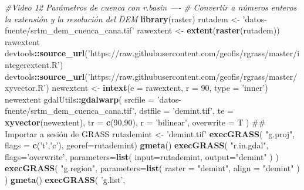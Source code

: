 \documentclass[11pt,]{article}
\newenvironment{Shaded}{\begin{snugshade}}{\end{snugshade}}
\newcommand{\KeywordTok}[1]{\textcolor[rgb]{0.13,0.29,0.53}{\textbf{#1}}}
\newcommand{\DataTypeTok}[1]{\textcolor[rgb]{0.13,0.29,0.53}{#1}}
\newcommand{\DecValTok}[1]{\textcolor[rgb]{0.00,0.00,0.81}{#1}}
\newcommand{\StringTok}[1]{\textcolor[rgb]{0.31,0.60,0.02}{#1}}
\newcommand{\CommentTok}[1]{\textcolor[rgb]{0.56,0.35,0.01}{\textit{#1}}}
\newcommand{\OperatorTok}[1]{\textcolor[rgb]{0.81,0.36,0.00}{\textbf{#1}}}
\newcommand{\NormalTok}[1]{#1}
\begin{document}
\begin{Shaded}
\begin{Highlighting}[]
\CommentTok{#Video 12 Parámetros de cuenca con r.basin ----}
\CommentTok{# Convertir a números enteros la extensión y la resolución del DEM}
\KeywordTok{library}\NormalTok{(raster)}
\NormalTok{rutadem <-}\StringTok{ 'datos-fuente/srtm_dem_cuenca_cana.tif'}
\NormalTok{rawextent <-}\StringTok{ }\KeywordTok{extent}\NormalTok{(}\KeywordTok{raster}\NormalTok{(rutadem))}
\NormalTok{rawextent}
\NormalTok{devtools}\OperatorTok{::}\KeywordTok{source_url}\NormalTok{(}\StringTok{'https://raw.githubusercontent.com/geofis/rgrass/master/integerextent.R'}\NormalTok{)}
\NormalTok{devtools}\OperatorTok{::}\KeywordTok{source_url}\NormalTok{(}\StringTok{'https://raw.githubusercontent.com/geofis/rgrass/master/xyvector.R'}\NormalTok{)}
\NormalTok{newextent <-}\StringTok{ }\KeywordTok{intext}\NormalTok{(}\DataTypeTok{e =}\NormalTok{ rawextent, }\DataTypeTok{r =} \DecValTok{90}\NormalTok{, }\DataTypeTok{type =} \StringTok{'inner'}\NormalTok{)}
\NormalTok{newextent}
\NormalTok{gdalUtils}\OperatorTok{::}\KeywordTok{gdalwarp}\NormalTok{(}
    \DataTypeTok{srcfile =} \StringTok{'datos-fuente/srtm_dem_cuenca_cana.tif'}\NormalTok{,}
  \DataTypeTok{dstfile =} \StringTok{'demint.tif'}\NormalTok{,}
  \DataTypeTok{te =} \KeywordTok{xyvector}\NormalTok{(newextent),}
  \DataTypeTok{tr =} \KeywordTok{c}\NormalTok{(}\DecValTok{90}\NormalTok{,}\DecValTok{90}\NormalTok{),}
  \DataTypeTok{r =} \StringTok{'bilinear'}\NormalTok{,}
  \DataTypeTok{overwrite =}\NormalTok{ T}
\NormalTok{)}
\NormalTok{## Importar a sesión de GRASS}
\NormalTok{rutademint <-}\StringTok{ 'demint.tif'}
\KeywordTok{execGRASS}\NormalTok{(}
  \StringTok{"g.proj"}\NormalTok{,}
  \DataTypeTok{flags =} \KeywordTok{c}\NormalTok{(}\StringTok{'t'}\NormalTok{,}\StringTok{'c'}\NormalTok{),}
  \DataTypeTok{georef=}\NormalTok{rutademint)}
\KeywordTok{gmeta}\NormalTok{()}
\KeywordTok{execGRASS}\NormalTok{(}
  \StringTok{"r.in.gdal"}\NormalTok{,}
  \DataTypeTok{flags=}\StringTok{'overwrite'}\NormalTok{,}
  \DataTypeTok{parameters=}\KeywordTok{list}\NormalTok{(}
    \DataTypeTok{input=}\NormalTok{rutademint,}
    \DataTypeTok{output=}\StringTok{"demint"}
\NormalTok{  )}
\NormalTok{)}
\KeywordTok{execGRASS}\NormalTok{(}
  \StringTok{"g.region"}\NormalTok{,}
  \DataTypeTok{parameters=}\KeywordTok{list}\NormalTok{(}
    \DataTypeTok{raster =} \StringTok{"demint"}\NormalTok{,}
    \DataTypeTok{align =} \StringTok{"demint"}
\NormalTok{  )}
\NormalTok{)}
\KeywordTok{gmeta}\NormalTok{()}
\KeywordTok{execGRASS}\NormalTok{(}
  \StringTok{'g.list'}\NormalTok{,}

\end{Highlighting}
\end{Shaded}
\end{document}
